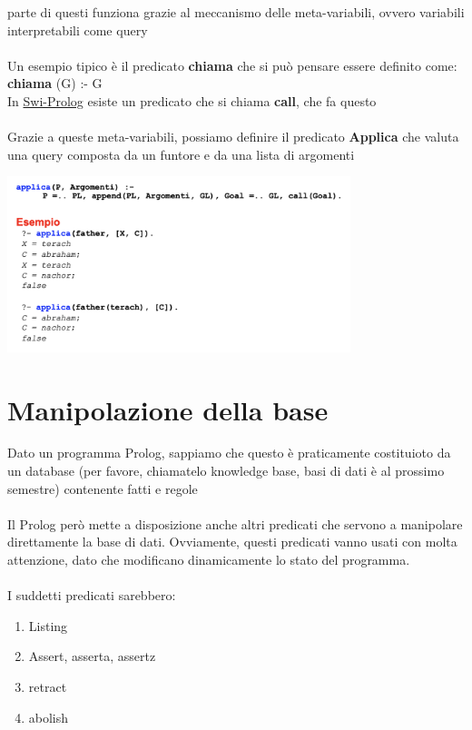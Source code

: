 \documentclass[12pt, a4paper, openany, oneside]{book}
\begin{document}
parte di questi funziona grazie al meccanismo delle meta-variabili, ovvero 
variabili interpretabili come query\\ \\
Un esempio tipico è il predicato \textbf{chiama} che si può pensare essere
definito come: \color{red} \textbf{chiama}  \color{black}(G) :- G \\
In \href{https://swish.swi-prolog.org/}{Swi-Prolog} esiste un predicato che si
chiama \textbf{call}, che fa questo \\ \\
Grazie a queste meta-variabili, possiamo definire il predicato \textbf{Applica}
che valuta una query composta da un funtore e da una lista di argomenti
\begin{center}
\includegraphics[width=0.75\textwidth]{7}
\end{center}
\section{Manipolazione della base}  
Dato un programma Prolog, sappiamo che questo è praticamente costituioto da un
database (per favore, chiamatelo knowledge base, basi di dati è al prossimo 
semestre) contenente fatti e regole\\ \\
Il Prolog però mette a disposizione anche altri predicati che servono a 
manipolare direttamente la base di dati. Ovviamente, questi predicati vanno 
usati con molta attenzione, dato che modificano dinamicamente lo stato del 
programma.\\ \\
I suddetti predicati sarebbero:
\begin{enumerate}
	\item Listing
	\item Assert, asserta, assertz
	\item retract
	\item abolish
\end{enumerate}
\end{document}
